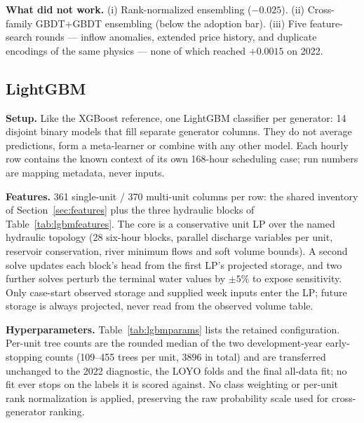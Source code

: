 \documentclass{article}
\begin{document}
\textbf{What did not work.} (i) Rank-normalized ensembling ($-0.025$).
(ii) Cross-family GBDT+GBDT ensembling (below the adoption bar).
(iii) Five feature-search rounds --- inflow anomalies, extended price
history, and duplicate encodings of the same physics --- none of which
reached $+0.0015$ on 2022.

\subsection{LightGBM}
\label{sec:lgbm}

\textbf{Setup.} Like the XGBoost reference, one LightGBM classifier per
generator: 14 disjoint binary models that fill separate generator columns.
They do not average predictions, form a meta-learner or combine with any
other model. Each hourly row contains the known context of its own
168-hour scheduling case; run numbers are mapping metadata, never inputs.

\textbf{Features.} 361 single-unit / 370 multi-unit columns per row: the
shared inventory of Section~\ref{sec:features} plus the three hydraulic
blocks of Table~\ref{tab:lgbmfeatures}. The core is a conservative unit
LP over the named hydraulic topology (28 six-hour blocks, parallel
discharge variables per unit, reservoir conservation, river minimum flows
and soft volume bounds). A second solve updates each block's head from
the first LP's projected storage, and two further solves perturb the
terminal water values by $\pm5\%$ to expose sensitivity. Only case-start
observed storage and supplied week inputs enter the LP; future storage is
always projected, never read from the observed volume table.

\textbf{Hyperparameters.} Table~\ref{tab:lgbmparams} lists the retained
configuration. Per-unit tree counts are the rounded median of the two
development-year early-stopping counts (109--455 trees per unit, 3896 in
total) and are transferred unchanged to the 2022 diagnostic, the LOYO
folds and the final all-data fit; no fit ever stops on the labels it is
scored against. No class weighting or per-unit rank normalization is
applied, preserving the raw probability scale used for cross-generator
ranking.
\end{document}
